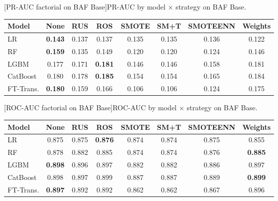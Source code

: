 \noindent\begin{minipage}{\linewidth}\centering
{}[PR-AUC factorial on BAF Base]{PR-AUC by model $\times$ strategy on BAF Base.}
\label{tab:factorial_baf_prauc}
\begin{tabular}{l c c c c c c c}
\toprule
Model & None & RUS & ROS & SMOTE & SM+T & SMOTEENN & Weights \\
\midrule
LR         & \textbf{0.143} & 0.137 & 0.137 & 0.135 & 0.135 & 0.136 & 0.122 \\
RF         & \textbf{0.159} & 0.135 & 0.149 & 0.120 & 0.120 & 0.124 & 0.146 \\
LGBM       & 0.177 & 0.171 & \textbf{0.181} & 0.146 & 0.146 & 0.158 & 0.181 \\
CatBoost   & 0.180 & 0.178 & \textbf{0.185} & 0.154 & 0.154 & 0.165 & 0.184 \\
FT-Trans.  & \textbf{0.180} & 0.159 & 0.166 & 0.106 & 0.106 & 0.124 & 0.175 \\
\bottomrule
\end{tabular}
\end{minipage}

\noindent\begin{minipage}{\linewidth}\centering
{}[ROC-AUC factorial on BAF Base]{ROC-AUC by model $\times$ strategy on BAF Base.}
\label{tab:factorial_baf_rocauc}
\begin{tabular}{l c c c c c c c}
\toprule
Model & None & RUS & ROS & SMOTE & SM+T & SMOTEENN & Weights \\
\midrule
LR         & 0.875 & 0.875 & \textbf{0.876} & 0.874 & 0.874 & 0.875 & 0.855 \\
RF         & 0.878 & 0.882 & 0.885 & 0.874 & 0.874 & 0.876 & \textbf{0.885} \\
LGBM       & \textbf{0.898} & 0.896 & 0.897 & 0.882 & 0.882 & 0.886 & 0.897 \\
CatBoost   & 0.898 & 0.897 & 0.899 & 0.887 & 0.887 & 0.889 & \textbf{0.899} \\
FT-Trans.  & \textbf{0.897} & 0.892 & 0.892 & 0.862 & 0.862 & 0.867 & 0.896 \\
\bottomrule
\end{tabular}
\end{minipage}

